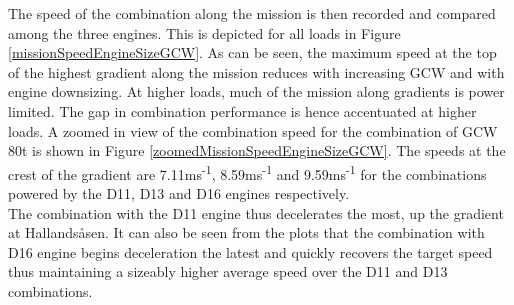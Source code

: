 \documentclass[ExampleMasters.tex]{subfiles}
\begin{document}
The speed of the combination along the mission is then recorded and compared among the three engines. This is depicted for all loads in Figure \ref{missionSpeedEngineSizeGCW}. As can be seen, the maximum speed at the top of the highest gradient along the mission reduces with increasing GCW and with engine downsizing. At higher loads, much of the mission along gradients is power limited. The gap in combination performance is hence accentuated at higher loads. A zoomed in view of the combination speed for the combination of GCW 80t is shown in Figure \ref{zoomedMissionSpeedEngineSizeGCW}. The speeds at the crest of the gradient are 7.11ms\textsuperscript{-1}, 8.59ms\textsuperscript{-1} and 9.59ms\textsuperscript{-1} for the combinations powered by the D11, D13 and D16 engines respectively.\\
The combination with the D11 engine thus decelerates the most, up the gradient at Hallands\aa sen. It can also be seen from the plots that the combination with D16 engine begins deceleration the latest and quickly recovers the target speed thus maintaining a sizeably higher average speed over the D11 and D13 combinations.
\end{document}
